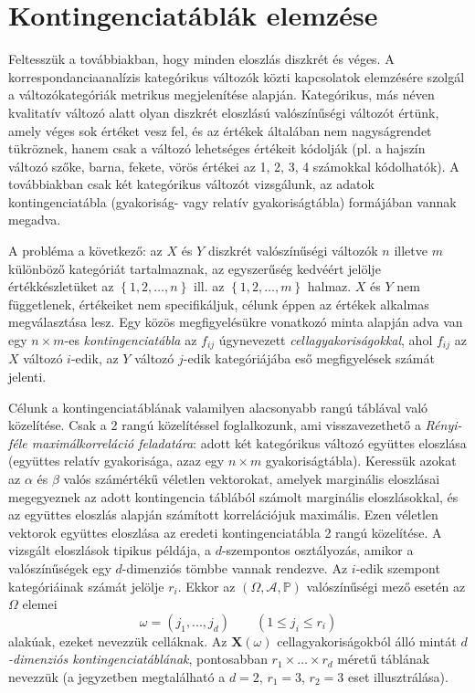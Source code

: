 \documentclass[%
	DIV=15,appendixprefix]{scrreprt}
\theoremstyle{definition}
\theoremstyle{remark}
\begin{document}
\section{Kontingenciatáblák elemzése}
%
Feltesszük a továbbiakban, hogy minden eloszlás diszkrét és véges. A korrespondanciaanalízis
kategórikus változók közti kapcsolatok elemzésére szolgál a változókategóriák metrikus megjelenítése
alapján. Kategórikus, más néven kvalitatív változó alatt olyan diszkrét eloszlású valószínűségi
változót értünk, amely véges sok értéket vesz fel, és az értékek általában nem nagyságrendet
tükröznek, hanem csak a változó lehetséges értékeit kódolják (pl. a hajszín változó szőke, barna,
fekete, vörös értékei az 1, 2, 3, 4 számokkal kódolhatók). A továbbiakban csak két kategórikus
változót vizsgálunk, az adatok kontingenciatábla (gyakoriság- vagy relatív gyakoriságtábla)
formájában vannak megadva.

A probléma a következő: az $X$ és $Y$ diszkrét valószínűségi változók $n$ illetve $m$ különböző
kategóriát tartalmaznak, az egyszerűség kedvéért jelölje értékkészletüket az $ \left\{1,{} 2,{}
\ldots,{} n \right\} $ ill. az $ \left\{1,{} 2,{} \ldots,{} m \right\} $ halmaz. $X$ és $Y$ nem
függetlenek, értékeiket nem specifikáljuk, célunk éppen az értékek alkalmas megválasztása lesz. Egy
közös megfigyelésükre vonatkozó minta alapján adva van egy $n \times m$-es \emph{kontingenciatábla}
az $f_{ij}$ úgynevezett \emph{cellagyakoriságokkal}, ahol $f_{ij}$ az $X$ változó $i$-edik, az $Y$
változó $j$-edik kategóriájába eső megfigyelések számát jelenti.

Célunk a kontingenciatáblának valamilyen alacsonyabb rangú táblával való közelítése. Csak a 2 rangú
közelítéssel foglalkozunk, ami visszavezethető a \emph{Rényi-féle maximálkorreláció feladatára}:
adott két kategórikus változó együttes eloszlása (együttes relatív gyakorisága, azaz egy $n \times
m$ gyakoriságtábla). Keressük azokat az $\alpha$ és $\beta$ valós számértékű véletlen vektorokat,
amelyek marginális eloszlásai megegyeznek az adott kontingencia táblából számolt marginális
eloszlásokkal, és az együttes eloszlás alapján számított korrelációjuk maximális. Ezen véletlen
vektorok együttes eloszlása az eredeti kontingenciatábla 2 rangú közelítése.
%
A vizsgált eloszlások tipikus példája, a $d$-szempontos osztályozás, amikor a valószínűségek egy
$d$-dimenziós tömbbe vannak rendezve. Az $i$-edik szempont kategóriáinak számát jelölje $r_i$. Ekkor
az $\left( \Omega,{}\mathcal{A},{}\mathbb{P}  \right)$ valószínűségi mező esetén az $\Omega$ elemei
\begin{equation*}
	\omega = \left(j_1,...,j_d\right) \qquad \left( 1 \le j_i \le r_i \right)
\end{equation*}
alakúak, ezeket nevezzük celláknak. Az $\mathbf{X}\left(\omega\right)$ cellagyakoriságokból álló
mintát \emph{$d$-dimenziós kontingenciatáblának}, pontosabban $r_1 \times \ldots \times r_d$ méretű
táblának nevezzük (a jegyzetben megtalálható a $d=2$, $r_1=3$, $r_2=3$ eset illusztrálása).
\end{document}
